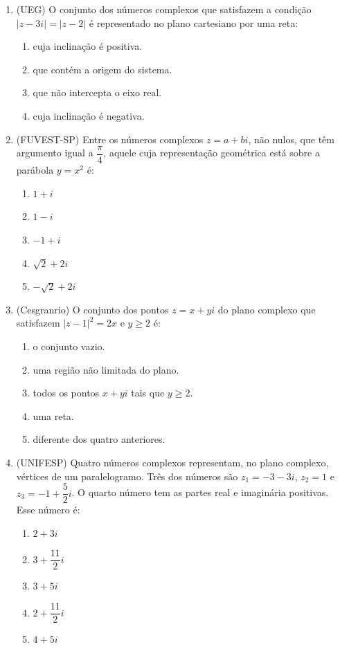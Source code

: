 \documentclass[12pt,a4paper]{article}
\begin{document}
\begin{enumerate}[label=\textbf{\arabic*)}, leftmargin=*]
  \item (UEG) O conjunto dos números complexos que satisfazem a condição $|z - 3i| = |z - 2|$ é representado no plano cartesiano por uma reta:
  \begin{enumerate}
    \item cuja inclinação é positiva.
    \item que contém a origem do sistema.
    \item que não intercepta o eixo real.
    \item cuja inclinação é negativa.
  \end{enumerate}

  \item (FUVEST-SP) Entre os números complexos $z = a + bi$, não nulos, que têm argumento igual a $\dfrac{\pi}{4}$, aquele cuja representação geométrica está sobre a parábola $y = x^2$ é:
  \begin{enumerate}
    \item $1 + i$
    \item $1 - i$
    \item $-1 + i$
    \item $\sqrt{2} + 2i$
    \item $-\sqrt{2} + 2i$
  \end{enumerate}

  \item (Cesgranrio) O conjunto dos pontos $z = x + yi$ do plano complexo que satisfazem $|z - 1|^2 = 2x$ e $y \ge 2$ é:
  
  \begin{enumerate}
    \item o conjunto vazio.
    \item uma região não limitada do plano.
    \item todos os pontos $x + yi$ tais que $y \ge 2$.
    \item uma reta.
    \item diferente dos quatro anteriores.
  \end{enumerate}

  
  \item (UNIFESP) Quatro números complexos representam, no plano complexo, vértices de um paralelogramo. Três dos números são $z_1 = -3 - 3i$, $z_2 = 1$ e $z_3 = -1 + \dfrac{5}{2}i$. O quarto número tem as partes real e imaginária positivas. Esse número é:
  \begin{enumerate}
    \item $2 + 3i$
    \item $3 + \dfrac{11}{2}i$
    \item $3 + 5i$
    \item $2 + \dfrac{11}{2}i$
    \item $4 + 5i$
  \end{enumerate}


\end{enumerate}
\end{document}
